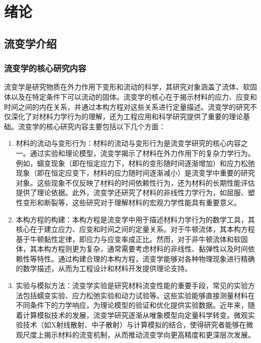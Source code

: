 \chapter{绪论}

\section{流变学介绍}
\subsection{流变学的核心研究内容}
流变学是研究物质在外力作用下变形和流动的科学，其研究对象涵盖了流体、软固体以及在特定条件下可以流动的固体\cite{dealyIntroductionRheology1990}。流变学的核心在于揭示材料的应力、应变和时间之间的内在关系，并通过本构方程对这些关系进行定量描述。流变学的研究不仅深化了对材料力学行为的理解，还为工程应用和科学研究提供了重要的理论基础。流变学的核心研究内容主要包括以下几个方面\cite{elleroTanner90Years2024,ewoldtDesigningComplexFluids2022}：
\begin{enumerate}[topsep = 0 pt, itemsep= 0 pt, parsep=0pt, partopsep=0pt, leftmargin=44pt, itemindent=0pt, labelsep=6pt, label=(\arabic*)]
  \item 材料的流动与变形行为：材料的流动与变形行为是流变学研究的核心内容之一。通过实验和理论模型，流变学揭示了材料在外力作用下的复杂力学行为。例如，蠕变现象（即在恒定应力下，材料的变形随时间逐渐增加）和应力松弛现象（即在恒定应变下，材料的应力随时间逐渐减小）是流变学中重要的研究对象\cite{BARNES19971,banerjeeRoleRheologyMorphology2023}。这些现象不仅反映了材料的时间依赖性行为，还为材料的长期性能评估提供了理论依据。此外，流变学还研究了材料的非线性力学行为，如屈服、塑性变形和断裂等，这些研究对于理解材料的宏观力学性能具有重要意义\cite{zenerElasticityAnelasticityMetals1949,hajikarimiViscoelasticityTheoreticalBackground2023}。
  \item	  本构方程的构建：本构方程是流变学中用于描述材料力学行为的数学工具，其核心在于建立应力、应变和时间之间的定量关系。对于牛顿流体，其本构方程基于牛顿黏性定律，即应力与应变率成正比\cite{elleroTanner90Years2024}。然而，对于非牛顿流体和软固体，其本构方程则更为复杂，通常需要考虑材料的非线性、黏弹性以及时间依赖性等特性\cite{sunReviewConstitutiveModels2024}。通过构建合理的本构方程，流变学能够对各种物理现象进行精确的数学描述，从而为工程设计和材料开发提供理论支持。
  \item  实验与模拟方法：流变学实验是研究材料流变性能的重要手段，常见的实验方法包括蠕变实验、应力松弛实验和动力试验等\cite{ewoldtDesigningComplexFluids2022}。这些实验能够直接测量材料在不同条件下的力学响应，为理论模型的验证和优化提供实验数据。近年来，随着计算模拟技术的发展，流变学研究逐渐从唯象模型向定量科学转变。微观实验技术（如X射线散射、中子散射）与计算模拟的结合，使得研究者能够在微观尺度上揭示材料的流变机制，从而推动流变学向更高精度和更深层次发展\cite{kuschelNonlinearEnhancementUltrafast2025,sun2022relaxation}。
\end{enumerate}
